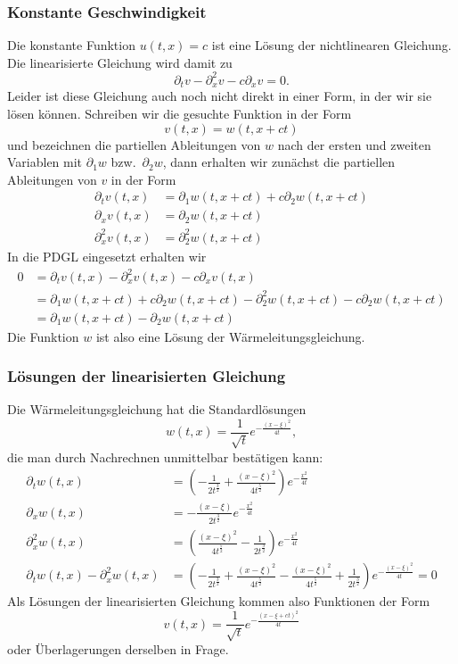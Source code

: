 \subsubsection{Konstante Geschwindigkeit}
Die konstante Funktion $u(t,x)=c$ ist eine Lösung der nichtlinearen
Gleichung. Die linearisierte Gleichung wird damit zu
\[
\partial_tv
-\partial_x^2v
-c\partial_xv=0.
\]
Leider ist diese Gleichung auch noch nicht direkt in einer Form,
in der wir sie lösen können. Schreiben wir die gesuchte Funktion
in der Form
\[
v(t,x)=w(t,x+ct)
\]
und bezeichnen die partiellen Ableitungen von $w$ nach der ersten
und zweiten Variablen mit $\partial_1w$ bzw.~$\partial_2w$, dann
erhalten wir zunächst die partiellen Ableitungen von $v$
in der Form
\begin{align*}
\partial_t v(t,x)&=\partial_1w(t,x+ct)+c\partial_2w(t,x+ct)
\\
\partial_x v(t,x)&=\partial_2w(t,x+ct)
\\
\partial_x^2v(t,x)&=\partial_2^2w(t,x+ct)
\end{align*}
In die PDGL eingesetzt erhalten wir
\begin{align*}
0&=
\partial_t v(t,x)
-\partial_x^2v(t,x)
-c\partial_x v(t,x)
\\
&=
\partial_1w(t,x+ct)+c\partial_2w(t,x+ct)
-\partial_2^2w(t,x+ct)
-c\partial_2w(t,x+ct)
\\
&=\partial_1w(t,x+ct)-\partial_2w(t,x+ct)
\end{align*}
Die Funktion $w$ ist also eine Lösung der Wärmeleitungsgleichung.

\subsubsection{Lösungen der linearisierten Gleichung}
Die Wärmeleitungsgleichung hat die Standardlösungen
\[
w(t,x)=\frac1{\sqrt{t}}e^{-\frac{(x-\xi)^2}{4t}},
\]
die man durch Nachrechnen unmittelbar bestätigen kann:
\begin{align*}
\partial_t w(t,x)
&=
\left(
-\frac1{2t^{\frac32}}
+\frac{(x-\xi)^2}{4t^{\frac52}}
\right)e^{-\frac{x^2}{4t}}
\\
\partial_x w(t,x)
&=
-\frac{(x-\xi)}{2t^{\frac32}}
e^{-\frac{x^2}{4t}}
\\
\partial_x^2w(t,x)
&=
\left(
\frac{(x-\xi)^2}{4t^{\frac52}}
-\frac{1}{2t^{\frac32}}
\right)e^{-\frac{x^2}{4t}}
\\
\partial_tw(t,x)-\partial_x^2w(t,x)
&=
\left(
-\frac1{2t^{\frac32}}
+\frac{(x-\xi)^2}{4t^{\frac52}}
-\frac{(x-\xi)^2}{4t^{\frac52}}
+\frac{1}{2t^{\frac32}}
\right)e^{-\frac{(x-\xi)^2}{4t}}=0
\end{align*}
Als Lösungen der linearisierten Gleichung kommen also Funktionen der
Form
\[
v(t,x)=\frac1{\sqrt{t}}e^{-\frac{(x-\xi+ct)^2}{4t}}
\]
oder Überlagerungen derselben in Frage.

